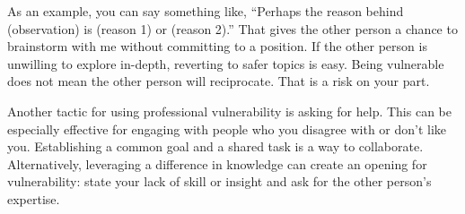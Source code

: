 As an example, you can say something like, ``Perhaps the reason behind (observation) is (reason 1) or (reason 2).'' That gives the other person a chance to brainstorm with me without committing to a position. If the other person is unwilling to explore in-depth, reverting to safer topics is easy. Being vulnerable does not mean the other person will reciprocate. That is a risk on your part. 

Another tactic for using professional vulnerability is asking for help. This can be especially effective for engaging with people who you disagree with or don't like you. Establishing a common goal and a shared task is a way to collaborate. Alternatively, leveraging a difference in knowledge can create an opening for vulnerability: state your lack of skill or insight and ask for the other person's expertise. 